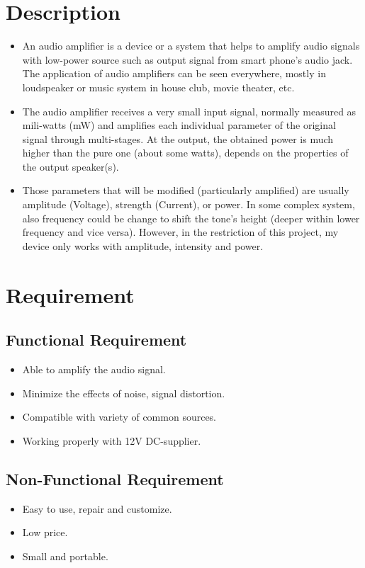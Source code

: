 \documentclass[twoside, a4paper, leqno]{article}
\begin{document}
	\section{Description}
		\begin{itemize}
			\item An audio amplifier is a device or a system that helps to amplify audio signals with low-power source such as output signal from smart phone's audio jack. The application of audio amplifiers can be seen everywhere, mostly in loudspeaker or music system in house club, movie theater, etc.
			\item The audio amplifier receives a very small input signal, normally measured as mili-watts (mW) and amplifies each individual parameter of the original signal through multi-stages. At the output, the obtained power is much higher than the pure one (about some watts), depends on the properties of the output speaker(s).
			\item Those parameters that will be modified (particularly amplified) are usually amplitude (Voltage), strength (Current), or power. In some complex system, also frequency could be change to shift the tone's height (deeper within lower frequency and vice versa). However, in the restriction of this project, my device only works with amplitude, intensity and power.
		\end{itemize}
		
		
	\section{Requirement}
	\subsection{Functional Requirement}
		\begin{itemize}
			\item Able to amplify the audio signal.
			\item Minimize the effects of noise, signal distortion.
			\item Compatible with variety of common sources.
			\item Working properly with 12V DC-supplier.
		\end{itemize} 
	\subsection{Non-Functional Requirement}
		\begin{itemize}
			\item Easy to use, repair and customize.
			\item Low price.
			\item Small and portable.
		\end{itemize}
	
\end{document}
